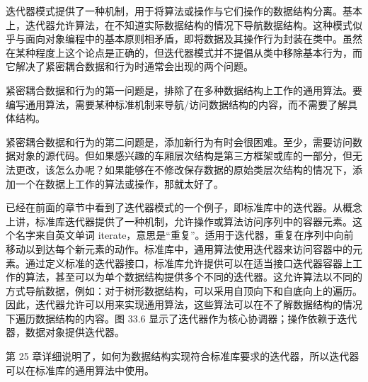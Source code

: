 迭代器模式提供了一种机制，用于将算法或操作与它们操作的数据结构分离。基本上，迭代器允许算法，在不知道实际数据结构的情况下导航数据结构。这种模式似乎与面向对象编程中的基本原则相矛盾，即将数据及其操作行为封装在类中。虽然在某种程度上这个论点是正确的，但迭代器模式并不提倡从类中移除基本行为，而它解决了紧密耦合数据和行为时通常会出现的两个问题。

紧密耦合数据和行为的第一问题是，排除了在多种数据结构上工作的通用算法。要编写通用算法，需要某种标准机制来导航/访问数据结构的内容，而不需要了解具体结构。

紧密耦合数据和行为的第二问题是，添加新行为有时会很困难。至少，需要访问数据对象的源代码。但如果感兴趣的车厢层次结构是第三方框架或库的一部分，但无法更改，该怎么办呢？如果能够在不修改保存数据的原始类层次结构的情况下，添加一个在数据上工作的算法或操作，那就太好了。

已经在前面的章节中看到了迭代器模式的一个例子，即标准库中的迭代器。从概念上讲，标准库迭代器提供了一种机制，允许操作或算法访问序列中的容器元素。这个名字来自英文单词 iterate，意思是“重复”。适用于迭代器，重复在序列中向前移动以到达每个新元素的动作。标准库中，通用算法使用迭代器来访问容器中的元素。通过定义标准的迭代器接口，标准库允许提供可以在适当接口迭代器容器上工作的算法，甚至可以为单个数据结构提供多个不同的迭代器。这允许算法以不同的方式导航数据，例如：对于树形数据结构，可以采用自顶向下和自底向上的遍历。因此，迭代器允许可以用来实现通用算法，这些算法可以在不了解数据结构的情况下遍历数据结构的内容。图 33.6 显示了迭代器作为核心协调器；操作依赖于迭代器，数据对象提供迭代器。


第 25 章详细说明了，如何为数据结构实现符合标准库要求的迭代器，所以迭代器可以在标准库的通用算法中使用。




































